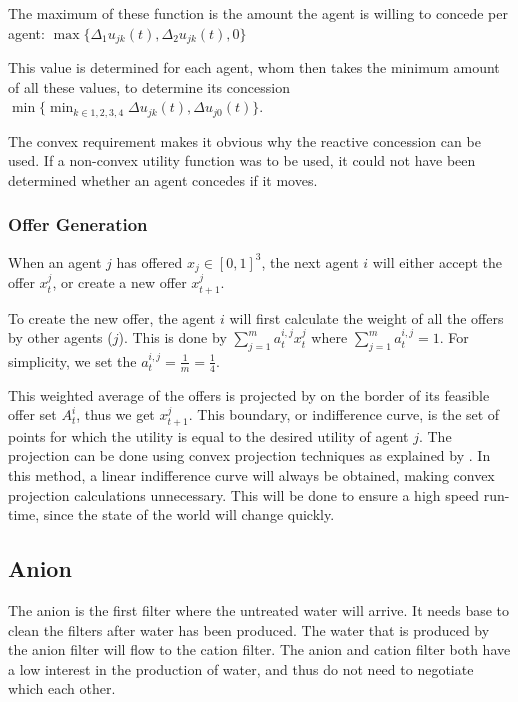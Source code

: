  The maximum of these function is the amount the agent is willing to concede per agent: $\max \{\Delta_1u_{jk}(t), \Delta_2u_{jk}(t),0\}$

This value is determined for each agent, whom then takes the minimum amount of all these values, to determine its concession $\min \{\displaystyle \min_{k\in 1, 2, 3, 4}\Delta u_{jk}(t), \Delta u_{j0}(t)\}$.

The convex requirement makes it obvious why the reactive concession can be used. If a non-convex utility function was to be used, it could not have been determined whether an agent concedes if it moves. 



\subsubsection{Offer Generation}
When an agent $j$ has offered $x_j\in[0,1]^3$, the next agent $i$ will either accept the offer $x^j_t$, or create a new offer $x^j_{t+1}$. 

To create the new offer, the agent $i$ will first calculate the weight of all the offers by other agents ($j$). This is done by $\sum_{j=1}^{m} a^{i,j}_t x^j_t $ where $\sum_{j=1}^{m}a^{i,j}_t = 1$. For simplicity, we set the $a^{i,j}_t = \frac{1}{m} = \frac{1}{4}$. 

This weighted average of the offers is projected by on the border of its feasible offer set $A^i_t$, thus we get $x^j_{t+1}$. This boundary, or indifference curve, is the set of points for which the utility is equal to the desired utility of agent $j$. The projection can be done using convex projection techniques as explained by \citet{boyd2004convex}. In this method, a linear indifference curve will always be obtained, making convex projection calculations unnecessary. This will be done to ensure a high speed run-time, since the state of the world will change quickly.



\subsection{Anion}
The anion is the first filter where the untreated water will arrive. It needs base to clean the filters after water has been produced. The water that is produced by the anion filter will flow to the cation filter. The anion and cation filter both have a low interest in the production of water, and thus do not need to negotiate which each other.%

